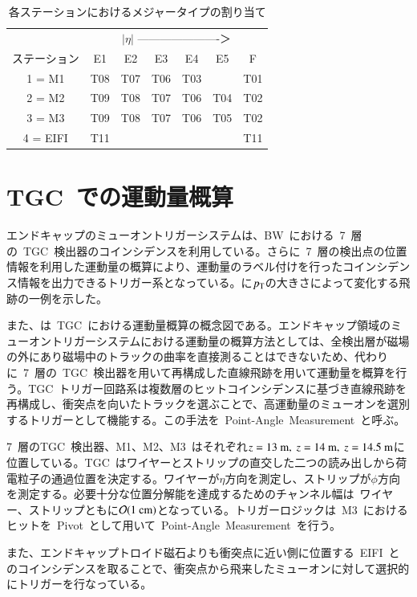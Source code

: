 \begin{table}[tb]
	\centering
	\begin{tabular}{c|cccccc}\hline
	& \multicolumn{6}{|c}{$|\eta|$ ----------------------＞} \\
	ステーション & E1 & E2 & E3 & E4 & E5 & F \\ \hline
	1 = M1 & T08 & T07 & T06 & T03 & & T01 \\
	2 = M2 & T09 & T08 & T07 & T06 & T04 & T02 \\
	3 = M3 & T09 & T08 & T07 & T06 & T05 & T02 \\
	4 = EIFI & T11 &&&&& T11 \\ \hline
	\end{tabular}
	\caption{各ステーションにおけるメジャータイプの割り当て}
	\label{tb:4tgc}
\end{table}

\section{TGC~での運動量概算}
エンドキャップのミューオントリガーシステムは、BW~における~7~層の~TGC~検出器のコインシデンスを利用している。さらに~7~層の検出点の位置情報を利用した運動量の概算により、運動量のラベル付けを行ったコインシデンス情報を出力できるトリガー系となっている。に$p_{\rm{T}}$の大きさによって変化する飛跡の一例を示した。

また、は~TGC~における運動量概算の概念図である。エンドキャップ領域のミューオントリガーシステムにおける運動量の概算方法としては、全検出層が磁場の外にあり磁場中のトラックの曲率を直接測ることはできないため、代わりに~7~層の~TGC~検出器を用いて再構成した直線飛跡を用いて運動量を概算を行う。TGC~トリガー回路系は複数層のヒットコインシデンスに基づき直線飛跡を再構成し、衝突点を向いたトラックを選ぶことで、高運動量のミューオンを選別するトリガーとして機能する。この手法を~Point-Angle~Measurement~と呼ぶ。

7~層のTGC~検出器、M1、M2、M3~はそれぞれ$\it{z}=\rm{13}~\rm{m},~\it{z}=\rm{14}~\rm{m},~\it{z}=\rm{14.5}~\rm{m}$に位置している。TGC~はワイヤーとストリップの直交した二つの読み出しから荷電粒子の通過位置を決定する。ワイヤーが$\eta$方向を測定し、ストリップが$\phi$方向を測定する。必要十分な位置分解能を達成するためのチャンネル幅は~ワイヤー、ストリップともに$\mathcal{O}(1~\rm{cm})$となっている。トリガーロジックは~M3~におけるヒットを~Pivot~として用いて~Point-Angle~Measurement~を行う。

また、エンドキャップトロイド磁石よりも衝突点に近い側に位置する~EIFI~とのコインシデンスを取ることで、衝突点から飛来したミューオンに対して選択的にトリガーを行なっている。

